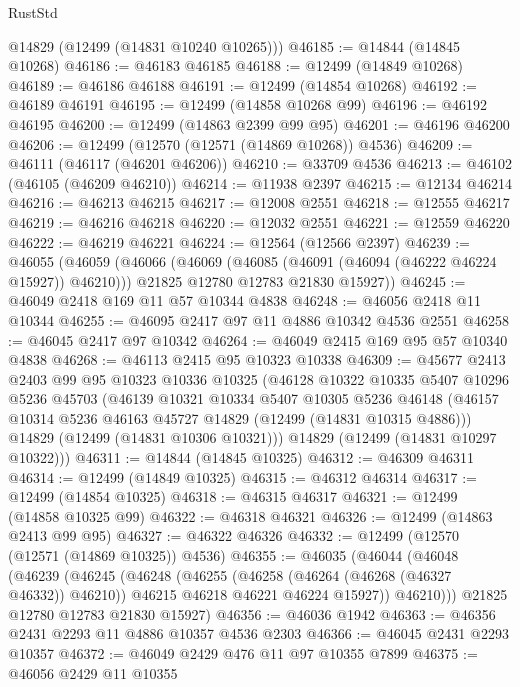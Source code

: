 \begin{lexlean}{RustStd}
\begin{coremodule}
      @14829
      (@12499 (@14831 @10240 @10265)))
@46185 := @14844 (@14845 @10268)
@46186 := @46183 @46185
@46188 := @12499 (@14849 @10268)
@46189 := @46186 @46188
@46191 := @12499 (@14854 @10268)
@46192 := @46189 @46191
@46195 := @12499 (@14858 @10268 @99)
@46196 := @46192 @46195
@46200 := @12499 (@14863 @2399 @99 @95)
@46201 := @46196 @46200
@46206 := @12499 (@12570 (@12571 (@14869 @10268)) @4536)
@46209 := @46111 (@46117 (@46201 @46206))
@46210 := @33709 @4536
@46213 := @46102 (@46105 (@46209 @46210))
@46214 := @11938 @2397
@46215 := @12134 @46214
@46216 := @46213 @46215
@46217 := @12008 @2551
@46218 := @12555 @46217
@46219 := @46216 @46218
@46220 := @12032 @2551
@46221 := @12559 @46220
@46222 := @46219 @46221
@46224 := @12564 (@12566 @2397)
@46239 := @46055
    (@46059
      (@46066
        (@46069 (@46085 (@46091 (@46094 (@46222 @46224 @15927)) @46210)))
        @21825
        @12780
        @12783
        @21830
        @15927))
@46245 := @46049 @2418 @169 @11 @57 @10344 @4838
@46248 := @46056 @2418 @11 @10344
@46255 := @46095 @2417 @97 @11 @4886 @10342 @4536 @2551
@46258 := @46045 @2417 @97 @10342
@46264 := @46049 @2415 @169 @95 @57 @10340 @4838
@46268 := @46113 @2415 @95 @10323 @10338
@46309 := @45677
    @2413
    @2403
    @99
    @95
    @10323
    @10336
    @10325
    (@46128
      @10322
      @10335
      @5407
      @10296
      @5236
      @45703
      (@46139
        @10321
        @10334
        @5407
        @10305
        @5236
        @46148
        (@46157 @10314 @5236 @46163 @45727 @14829 (@12499 (@14831 @10315 @4886)))
        @14829
        (@12499 (@14831 @10306 @10321)))
      @14829
      (@12499 (@14831 @10297 @10322)))
@46311 := @14844 (@14845 @10325)
@46312 := @46309 @46311
@46314 := @12499 (@14849 @10325)
@46315 := @46312 @46314
@46317 := @12499 (@14854 @10325)
@46318 := @46315 @46317
@46321 := @12499 (@14858 @10325 @99)
@46322 := @46318 @46321
@46326 := @12499 (@14863 @2413 @99 @95)
@46327 := @46322 @46326
@46332 := @12499 (@12570 (@12571 (@14869 @10325)) @4536)
@46355 := @46035
    (@46044
      (@46048
        (@46239
          (@46245
            (@46248
              (@46255
                (@46258 (@46264 (@46268 (@46327 @46332)) @46210))
                @46215
                @46218
                @46221
                @46224
                @15927))
            @46210)))
      @21825
      @12780
      @12783
      @21830
      @15927)
@46356 := @46036 @1942
@46363 := @46356 @2431 @2293 @11 @4886 @10357 @4536 @2303
@46366 := @46045 @2431 @2293 @10357
@46372 := @46049 @2429 @476 @11 @97 @10355 @7899
@46375 := @46056 @2429 @11 @10355

\end{coremodule}
\end{lexlean}
